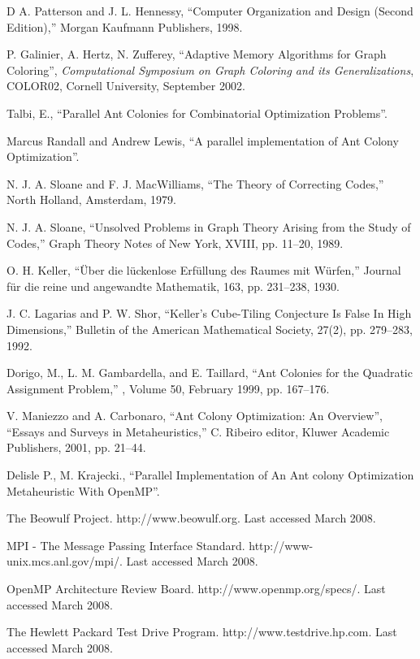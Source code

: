 \documentclass[11pt]{article}
\begin{document}
\begin{thebibliography}{99}
D A. Patterson and J. L. Hennessy, ``Computer Organization and Design (Second Edition),'' Morgan Kaufmann Publishers, 1998.

P. Galinier, A. Hertz, N. Zufferey,
``Adaptive Memory Algorithms for Graph Coloring'',
{\it Computational Symposium on Graph Coloring and its Generalizations}, 
COLOR02,
Cornell University, September 2002.

Talbi, E., ``Parallel Ant Colonies for Combinatorial Optimization Problems''.

Marcus Randall and Andrew Lewis, ``A parallel implementation of Ant Colony Optimization''.


N. J. A. Sloane and F. J. MacWilliams, ``The Theory of Correcting Codes,'' North Holland, Amsterdam, 1979.

N. J. A. Sloane, ``Unsolved Problems in Graph Theory Arising from the Study of Codes,'' Graph Theory Notes of New York, XVIII, pp. 11--20, 1989.


O. H. Keller, ``\"Uber die l\"uckenlose Erf\"ullung des Raumes mit W\"urfen,'' 
Journal f\"ur die reine und angewandte Mathematik, 163, pp. 231--238, 1930.

J. C. Lagarias and P. W. Shor, ``Keller's Cube-Tiling Conjecture Is False In High Dimensions,'' Bulletin of the American Mathematical Society, 27(2), pp. 279--283, 1992.


Dorigo, M., L. M. Gambardella, and E. Taillard,
\newblock ``Ant Colonies for the Quadratic Assignment Problem,''
, Volume 50, February 1999, pp. 167--176.


V. Maniezzo and A. Carbonaro, ``Ant Colony Optimization: An Overview'', ``Essays and Surveys in Metaheuristics,'' C. Ribeiro editor, Kluwer Academic Publishers, 2001, pp. 21--44.


Delisle P., M. Krajecki., ``Parallel Implementation of An Ant colony Optimization Metaheuristic With OpenMP''.

The Beowulf Project. http://www.beowulf.org. Last accessed March 2008.

MPI - The Message Passing Interface Standard. http://www-unix.mcs.anl.gov/mpi/. Last accessed March 2008.


OpenMP Architecture Review Board. http://www.openmp.org/specs/. Last accessed March 2008.


The Hewlett Packard Test Drive Program. http://www.testdrive.hp.com. Last accessed March 2008.

\end{thebibliography}
\end{document}
